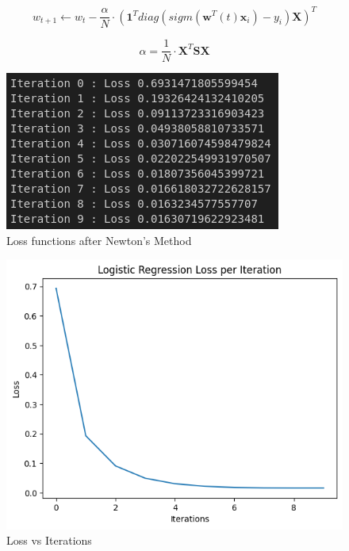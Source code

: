 \documentclass[11pt,a4paper]{article}
\begin{document}
\begin{equation}
    w_{t+1} \leftarrow w_{t} - \frac{\alpha}{N} \cdot( \mathbf{1}^T{diag}({sigm}(\mathbf{w}^T(t) \mathbf{x}_i) - y_i) \mathbf{X})^T
\end{equation}

\begin{equation}
    {\alpha} = \frac{1}{N}\cdot \mathbf{X}^T \mathbf{S} \mathbf{X}
\end{equation}

\lstset{style=mystyle}


{\begin{figure}[h]
    \centering
    \includegraphics[width=1.0\linewidth]{images/2.png}
    \caption{Loss functions after Newton's Method}
\end{figure}}

\lstset{style=mystyle}


\newpage

{\begin{figure}[h]
    \centering
    \includegraphics[width=1.0\linewidth]{images/22.png}
    \caption{Loss vs Iterations}
\end{figure}}
\end{document}
